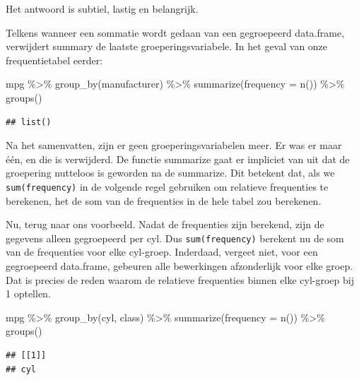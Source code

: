 \documentclass[]{tufte-book}
\newenvironment{Shaded}{}{}
\newcommand{\AttributeTok}[1]{\textcolor[rgb]{0.49,0.56,0.16}{#1}}
\newcommand{\FunctionTok}[1]{\textcolor[rgb]{0.02,0.16,0.49}{#1}}
\newcommand{\NormalTok}[1]{#1}
\newcommand{\SpecialCharTok}[1]{\textcolor[rgb]{0.25,0.44,0.63}{#1}}
\begin{document}
Het antwoord is subtiel, lastig en belangrijk.

Telkens wanneer een sommatie wordt gedaan van een gegroepeerd data.frame, verwijdert summary de laatste groeperingsvariabele. In het geval van onze frequentietabel eerder:

\begin{Shaded}
\begin{Highlighting}[]
\NormalTok{mpg }\SpecialCharTok{\%\textgreater{}\%}
  \FunctionTok{group\_by}\NormalTok{(manufacturer) }\SpecialCharTok{\%\textgreater{}\%}
  \FunctionTok{summarize}\NormalTok{(}\AttributeTok{frequency =} \FunctionTok{n}\NormalTok{()) }\SpecialCharTok{\%\textgreater{}\%}
  \FunctionTok{groups}\NormalTok{()}
\end{Highlighting}
\end{Shaded}

\begin{verbatim}
## list()
\end{verbatim}

Na het samenvatten, zijn er geen groeperingsvariabelen meer. Er was er maar één, en die is verwijderd. De functie summarize gaat er impliciet van uit dat de groepering nutteloos is geworden na de summarize. Dit betekent dat, als we \texttt{sum(frequency)} in de volgende regel gebruiken om relatieve frequenties te berekenen, het de som van de frequenties in de hele tabel zou berekenen.

Nu, terug naar ons voorbeeld. Nadat de frequenties zijn berekend, zijn de gegevens alleen gegroepeerd per cyl. Dus \texttt{sum(frequency)} berekent nu de som van de frequenties voor elke cyl-groep. Inderdaad, vergeet niet, voor een gegroepeerd data.frame, gebeuren alle bewerkingen afzonderlijk voor elke groep. Dat is precies de reden waarom de relatieve frequenties binnen elke cyl-groep bij 1 optellen.

\begin{Shaded}
\begin{Highlighting}[]
\NormalTok{mpg }\SpecialCharTok{\%\textgreater{}\%}
  \FunctionTok{group\_by}\NormalTok{(cyl, class) }\SpecialCharTok{\%\textgreater{}\%}
  \FunctionTok{summarize}\NormalTok{(}\AttributeTok{frequency =} \FunctionTok{n}\NormalTok{()) }\SpecialCharTok{\%\textgreater{}\%}
  \FunctionTok{groups}\NormalTok{()}
\end{Highlighting}
\end{Shaded}

\begin{verbatim}
## [[1]]
## cyl
\end{verbatim}
\end{document}
